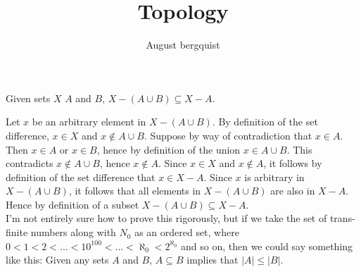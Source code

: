 \documentclass{article}
\title{Topology}
\author{August bergquist}
\theoremstyle{definition}
\begin{document}
 Given sets $X$ $A$ and $B$, $X-(A\cup B) \subseteq X-A$.

 Let $x$ be an arbitrary element in $X-(A\cup B)$. By definition of the set difference, $x\in X$ and $x\not\in A\cup B$. Suppose by way of contradiction that $x\in A$. Then $x\in A$ or $x\in B$, hence by definition of the union $x\in A\cup B$. This contradicts $x\not\in A\cup B$, hence $x\not \in A$. Since $x\in X$ and $x\not\in A$, it follows by definition of the set difference that $x\in X-A$. Since $x$ is arbitrary in $X- (A\cup B)$, it follows that all elements in $X- (A\cup B)$ are also in $X-A$. Hence by definition of a subset $X-(A\cup B) \subseteq X-A$.
\\

 I'm not entirely sure how to prove this rigorously, but if we take the set of trans-finite numbers along with $N_0$ as an ordered set, where $0< 1< 2<...<10^{100} < ...  < \aleph_0 < 2^{\aleph_0}$ and so on, then we could say something like this: Given any sets $A$ and $B$, $A\subseteq B$ implies that $|A| \le |B|$. \\
\end{document}
